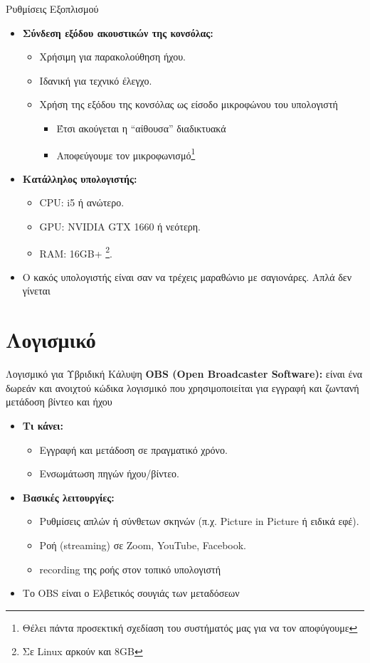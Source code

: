 \documentclass[aspectratio=169]{beamer}
\begin{document}
\begin{frame}{Ρυθμίσεις Εξοπλισμού}
  \begin{itemize}[<+->]
  \item \textbf{Σύνδεση εξόδου ακουστικών της κονσόλας:}
    \begin{itemize}
    \item Χρήσιμη για παρακολούθηση ήχου.
    \item Ιδανική για τεχνικό έλεγχο.
    \item Χρήση της εξόδου της κονσόλας ως είσοδο μικροφώνου του υπολογιστή
      \begin{itemize}
      \item Έτσι ακούγεται η \enquote{αίθουσα} διαδικτυακά
      \item Αποφεύγουμε τον μικροφωνισμό\footnote{Θέλει πάντα προσεκτική σχεδίαση του συστήματός μας για να τον αποφύγουμε}
      \end{itemize}
    \end{itemize}
  \item \textbf{Κατάλληλος υπολογιστής:}
    \begin{itemize}
    \item CPU: i5 ή ανώτερο.
    \item GPU: NVIDIA GTX 1660 ή νεότερη.
    \item RAM: 16GB+ \footnote{Σε Linux αρκούν και 8GB}.
    \end{itemize}
  \item Ο κακός υπολογιστής είναι σαν να τρέχεις μαραθώνιο με σαγιονάρες. Απλά δεν γίνεται
  \end{itemize}
\end{frame}

\section{Λογισμικό}
\begin{frame}{Λογισμικό για Υβριδική Κάλυψη}
  \textbf{OBS (Open Broadcaster Software):}
  είναι ένα δωρεάν και ανοιχτού κώδικα λογισμικό που χρησιμοποιείται για
  εγγραφή και ζωντανή μετάδοση βίντεο και ήχου
  \begin{itemize}[<+->]
  \item \textbf{Τι κάνει:}
    \begin{itemize}
    \item Εγγραφή και μετάδοση σε πραγματικό χρόνο.
    \item Ενσωμάτωση πηγών ήχου/βίντεο.
    \end{itemize}
  \item \textbf{Βασικές λειτουργίες:}
    \begin{itemize}[<+->]
    \item Ρυθμίσεις απλών ή σύνθετων σκηνών (π.χ. Picture in Picture ή ειδικά εφέ).
    \item Ροή (streaming) σε Zoom, YouTube, Facebook.
    \item recording της ροής στον τοπικό υπολογιστή
    \end{itemize}
  \item Το OBS είναι ο Ελβετικός σουγιάς των μεταδόσεων
  \end{itemize}
\end{frame}
\end{document}
